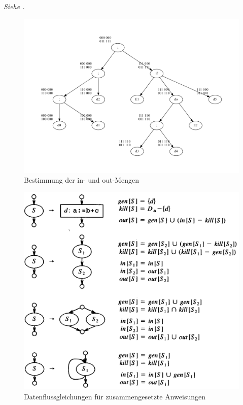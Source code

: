 \textit{Siehe .}
\begin{figure}
    \centering
    \includegraphics[scale=0.45]{images/convent-inout.pdf}
    \caption{Bestimmung der in- und out-Mengen}
    \label{convent:inout}
\end{figure}

\begin{figure}[p]
  \centering
  \includegraphics[scale=0.2]{images/bild1-3.png}
  \caption{Datenflussgleichungen für zusammengesetzte Anweisungen}
  \label{fig:datenflussgleichungen}
\end{figure}

